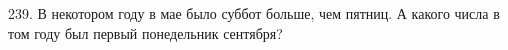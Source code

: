 239. В некотором году в мае было суббот больше, чем пятниц. А какого числа в том году был первый понедельник сентября?\\
